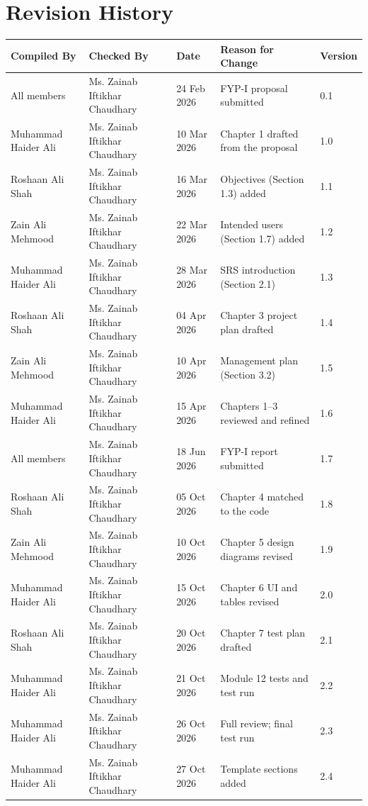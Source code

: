 \chapter*{Revision History}

\begin{center}
\footnotesize
\setlength{\tabcolsep}{4pt}
\renewcommand{\arraystretch}{1.2}
\begin{tabularx}{\textwidth}{l l l >{\raggedright\arraybackslash}X l}
\hline\hline
\textbf{Compiled By} & \textbf{Checked By} & \textbf{Date} & \textbf{Reason for Change} & \textbf{Version} \\
\hline
All members & Ms. Zainab Iftikhar Chaudhary & 24 Feb 2026 & FYP-I proposal submitted & 0.1 \\
Muhammad Haider Ali & Ms. Zainab Iftikhar Chaudhary & 10 Mar 2026 & Chapter 1 drafted from the proposal & 1.0 \\
Roshaan Ali Shah & Ms. Zainab Iftikhar Chaudhary & 16 Mar 2026 & Objectives (Section 1.3) added & 1.1 \\
Zain Ali Mehmood & Ms. Zainab Iftikhar Chaudhary & 22 Mar 2026 & Intended users (Section 1.7) added & 1.2 \\
Muhammad Haider Ali & Ms. Zainab Iftikhar Chaudhary & 28 Mar 2026 & SRS introduction (Section 2.1) & 1.3 \\
Roshaan Ali Shah & Ms. Zainab Iftikhar Chaudhary & 04 Apr 2026 & Chapter 3 project plan drafted & 1.4 \\
Zain Ali Mehmood & Ms. Zainab Iftikhar Chaudhary & 10 Apr 2026 & Management plan (Section 3.2) & 1.5 \\
Muhammad Haider Ali & Ms. Zainab Iftikhar Chaudhary & 15 Apr 2026 & Chapters 1--3 reviewed and refined & 1.6 \\
All members & Ms. Zainab Iftikhar Chaudhary & 18 Jun 2026 & FYP-I report submitted & 1.7 \\
Roshaan Ali Shah & Ms. Zainab Iftikhar Chaudhary & 05 Oct 2026 & Chapter 4 matched to the code & 1.8 \\
Zain Ali Mehmood & Ms. Zainab Iftikhar Chaudhary & 10 Oct 2026 & Chapter 5 design diagrams revised & 1.9 \\
Muhammad Haider Ali & Ms. Zainab Iftikhar Chaudhary & 15 Oct 2026 & Chapter 6 UI and tables revised & 2.0 \\
Roshaan Ali Shah & Ms. Zainab Iftikhar Chaudhary & 20 Oct 2026 & Chapter 7 test plan drafted & 2.1 \\
Muhammad Haider Ali & Ms. Zainab Iftikhar Chaudhary & 21 Oct 2026 & Module 12 tests and test run & 2.2 \\
Muhammad Haider Ali & Ms. Zainab Iftikhar Chaudhary & 26 Oct 2026 & Full review; final test run & 2.3 \\
Muhammad Haider Ali & Ms. Zainab Iftikhar Chaudhary & 27 Oct 2026 & Template sections added & 2.4 \\
\hline\hline
\end{tabularx}
\end{center}
